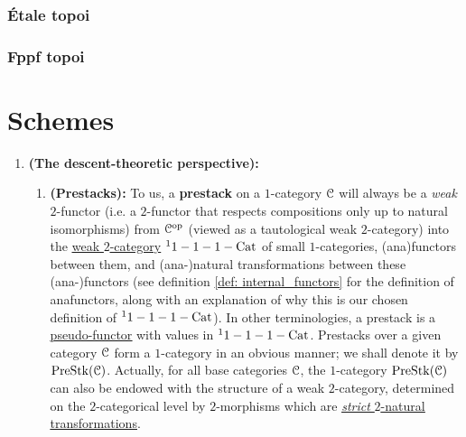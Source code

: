             \subsubsection{\'Etale topoi} 
            
            \subsubsection{Fppf topoi} 
        
    \section{Schemes} \label{section: schemes}
        \begin{convention} \label{conv: prestacks}  
            \noindent
            \begin{enumerate}
                \item \textbf{(The descent-theoretic perspective):} \begin{enumerate}
                    \item \textbf{(Prestacks):} To us, a \textbf{prestack} on a $1$-category $\mathcal{C}$ will always be a \textit{weak} $2$-functor (i.e. a $2$-functor that respects compositions only up to natural isomorphisms) from $\mathcal{C}^{\mathrm{op}}$ (viewed as a tautological weak $2$-category) into the \href{https://ncatlab.org/nlab/show/bicategory}{\underline{weak $2$-category}} ${}^11-1-1-\mathrm{Cat}$ of small $1$-categories, (ana)functors between them, and (ana-)natural transformations between these (ana-)functors (see definition \ref{def: internal_functors} for the definition of anafunctors, along with an explanation of why this is our chosen definition of ${}^11-1-1-\mathrm{Cat}$). In other terminologies, a prestack is a \href{https://ncatlab.org/nlab/show/pseudofunctor}{\underline{pseudo-functor}} with values in ${}^11-1-1-\mathrm{Cat}$. Prestacks over a given category $\mathcal{C}$ form a $1$-category in an obvious manner; we shall denote it by $\mathrm{Pre}\mathrm{Stk}(\mathcal{C})$. Actually, for all base categories $\mathcal{C}$, the $1$-category $\mathrm{Pre}\mathrm{Stk}(\mathcal{C})$ can also be endowed with the structure of a weak $2$-category, determined on the $2$-categorical level by $2$-morphisms which are \href{https://ncatlab.org/nlab/show/strict+2-natural+transformation}{\underline{\textit{strict} $2$-natural transformations}}.
                    

\end{enumerate}
\end{enumerate}
\end{convention}
